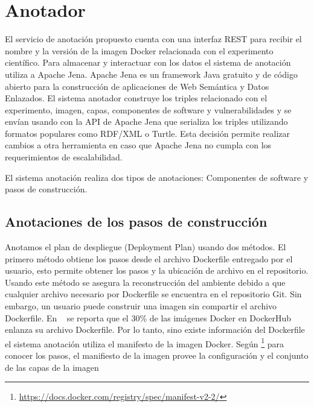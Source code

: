 \section{Anotador}\label{s4.2}

El servicio de anotación propuesto cuenta con una interfaz REST para recibir el nombre y la versión de la imagen Docker relacionada con el experimento científico. 
Para almacenar y interactuar con los datos el sistema de anotación utiliza a Apache Jena. Apache Jena es un framework Java gratuito y de código abierto para la construcción de aplicaciones de Web Semántica y Datos Enlazados. El sistema anotador construye los triples relacionado con el experimento, imagen, capas, componentes de software y vulnerabilidades y se envían usando con la API de Apache Jena que serializa los triples utilizando formatos populares como RDF/XML o Turtle.
Esta decisión permite realizar cambios a otra herramienta en caso que Apache Jena no cumpla con los requerimientos de escalabilidad.

El sistema anotación realiza dos tipos de anotaciones: Componentes de software y pasos de construcción.


\subsection{Anotaciones de los pasos de construcción}\label{s4.2.1}

Anotamos el plan de despliegue (Deployment Plan) usando dos métodos. El primero método obtiene los pasos desde el archivo Dockerfile entregado por el usuario, esto permite obtener los pasos y la ubicación de archivo en el repositorio. 
Usando este método se asegura la reconstrucción del ambiente debido a que cualquier archivo necesario por Dockerfile se encuentra en el repositorio Git.
Sin embargo, un usuario puede construir una imagen sin compartir el archivo Dockerfile. En ~\cite{DBLP:conf/semweb/OsorioAV18a} se reporta que el 30\% de las imágenes Docker en DockerHub enlanza su archivo Dockerfile. 
Por lo tanto, sino existe información del Dockerfile el sistema anotación utiliza el manifesto de la imagen Docker. Según \footnote{\url{https://docs.docker.com/registry/spec/manifest-v2-2/}} para conocer los pasos, el manifiesto de la imagen provee la configuración y el conjunto de las capas de la imagen

